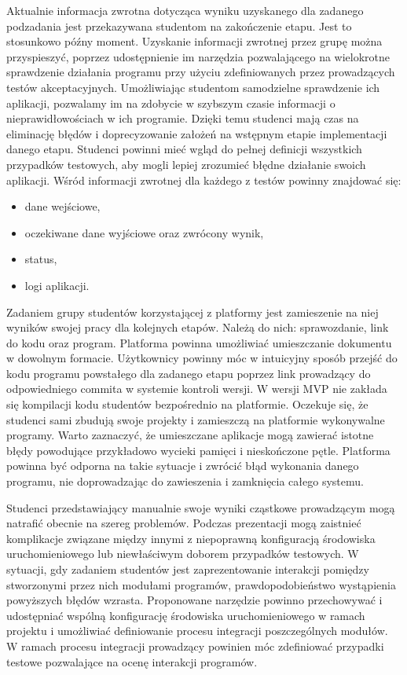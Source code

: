 Aktualnie informacja zwrotna dotycząca wyniku uzyskanego dla zadanego podzadania jest przekazywana studentom na zakończenie etapu.
Jest to stosunkowo późny moment.
Uzyskanie informacji zwrotnej przez grupę można przyspieszyć, poprzez udostępnienie im narzędzia pozwalającego na wielokrotne sprawdzenie działania programu przy użyciu zdefiniowanych przez prowadzących testów akceptacyjnych.
Umożliwiając studentom samodzielne sprawdzenie ich aplikacji, pozwalamy im na zdobycie w szybszym czasie informacji o nieprawidłowościach w ich programie.
Dzięki temu studenci mają czas na eliminację błędów i doprecyzowanie założeń na wstępnym etapie implementacji danego etapu.
Studenci powinni mieć wgląd do pełnej definicji wszystkich przypadków testowych, aby mogli lepiej zrozumieć błędne działanie swoich aplikacji.
Wśród informacji zwrotnej dla każdego z testów powinny znajdować się:
\begin{itemize}
    \item dane wejściowe,
    \item oczekiwane dane wyjściowe oraz zwrócony wynik,
    \item status,
    \item logi aplikacji.
\end{itemize}

Zadaniem grupy studentów korzystającej z platformy jest zamieszenie na niej wyników swojej pracy dla kolejnych etapów.
Należą do nich: sprawozdanie, link do kodu oraz program.
Platforma powinna umożliwiać umieszczanie dokumentu w dowolnym formacie.
Użytkownicy powinny móc w intuicyjny sposób przejść do kodu programu powstałego dla zadanego etapu poprzez link prowadzący do odpowiedniego commita w systemie kontroli wersji.
W wersji MVP nie zakłada się kompilacji kodu studentów bezpośrednio na platformie.
Oczekuje się, że studenci sami zbudują swoje projekty i zamieszczą na platformie wykonywalne programy.
Warto zaznaczyć, że umieszczane aplikacje mogą zawierać istotne błędy powodujące przykładowo wycieki pamięci i nieskończone pętle.
Platforma powinna być odporna na takie sytuacje i zwrócić błąd wykonania danego programu, nie doprowadzając do zawieszenia i zamknięcia całego systemu.

Studenci przedstawiający manualnie swoje wyniki cząstkowe prowadzącym mogą natrafić obecnie na szereg problemów.
Podczas prezentacji mogą zaistnieć komplikacje związane między innymi z niepoprawną konfiguracją środowiska uruchomieniowego lub niewłaściwym doborem przypadków testowych.
W sytuacji, gdy zadaniem studentów jest zaprezentowanie interakcji pomiędzy stworzonymi
przez nich modułami programów, prawdopodobieństwo wystąpienia powyższych błędów
wzrasta.
Proponowane narzędzie powinno przechowywać i udostępniać wspólną konfigurację środowiska uruchomieniowego w ramach projektu i umożliwiać definiowanie procesu integracji poszczególnych modułów.
W ramach procesu integracji prowadzący powinien móc zdefiniować przypadki testowe pozwalające na ocenę interakcji programów.

